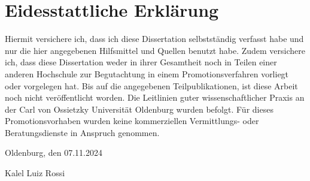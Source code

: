 \chapter*{Eidesstattliche Erklärung}

Hiermit versichere ich, dass ich diese Dissertation selbstständig verfasst habe und nur die hier angegebenen Hilfsmittel und Quellen benutzt habe. Zudem versichere ich, dass diese Dissertation weder in ihrer Gesamtheit noch in Teilen einer anderen Hochschule zur Begutachtung in einem Promotionsverfahren vorliegt oder vorgelegen hat. Bis auf die angegebenen Teilpublikationen, ist diese Arbeit noch nicht veröffentlicht worden. Die Leitlinien guter wissenschaftlicher Praxis an der Carl von Ossietzky Universität Oldenburg wurden befolgt. Für dieses Promotionsvorhaben wurden keine kommerziellen Vermittlungs- oder Beratungsdienste in Anspruch genommen.

\vspace{4cm}

Oldenburg, den 07.11.2024

Kalel Luiz Rossi